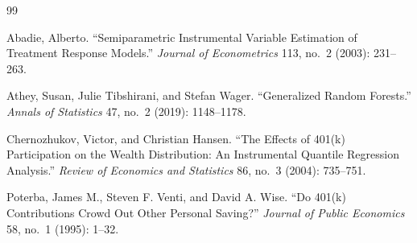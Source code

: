 \documentclass[11pt]{article}
\begin{document}
\renewcommand{\refname}{References}
\begin{thebibliography}{99}

Abadie, Alberto.
``Semiparametric Instrumental Variable Estimation of Treatment Response
Models.''
\emph{Journal of Econometrics} 113, no.~2 (2003): 231--263.

Athey, Susan, Julie Tibshirani, and Stefan Wager.
``Generalized Random Forests.''
\emph{Annals of Statistics} 47, no.~2 (2019): 1148--1178.

Chernozhukov, Victor, and Christian Hansen.
``The Effects of 401(k) Participation on the Wealth Distribution: An
Instrumental Quantile Regression Analysis.''
\emph{Review of Economics and Statistics} 86, no.~3 (2004): 735--751.

Poterba, James M., Steven F. Venti, and David A. Wise.
``Do 401(k) Contributions Crowd Out Other Personal Saving?''
\emph{Journal of Public Economics} 58, no.~1 (1995): 1--32.

\end{thebibliography}
\end{document}
